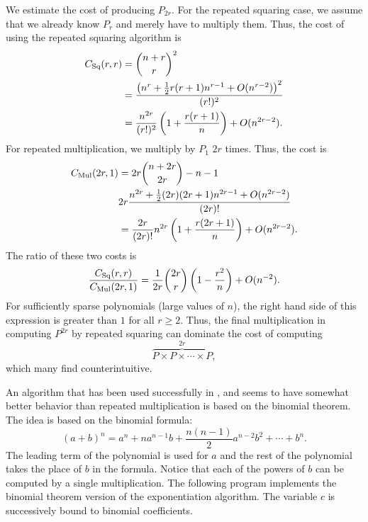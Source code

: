 We estimate the cost of producing $P_{2r}$.  For the repeated squaring
case, we assume that we already know $P_{r}$ and merely have to
multiply them.  Thus, the cost of using the repeated squaring
algorithm is
\[
\begin{aligned}
 C_{\rm Sq}(r,r) &= \binom{n + r}{r}^{2} \\
     & = \frac{\left(n^{r} + \frac{1}{2}r (r+1) n^{r-1}
                 + O(n^{r-2})\right)^{2}}{(r!)^{2}} \\
     & = \frac{n^{2r}}{(r!)^{2}}\left(1 + \frac{r(r+1)}{n}\right) 
                + O(n^{2r-2}).
\end{aligned}
\]
For repeated multiplication, we multiply by $P_{1}$ $2r$ times.  Thus, the
cost is
\[
\begin{aligned}
  C_{\rm Mul}(2r, 1) & = 2r \binom{n + 2r}{2r} - n-1 \\
     & 2r \frac{n^{2r} + \frac{1}{2}(2r)(2r+1) n^{2r-1} 
        + O(n^{2r-2})}{(2r)!} \\
     & = \frac{2r}{(2r)!}n^{2r}\left(1 + \frac{r(2r+1)}{n}\right) 
        + O(n^{2r-2}).
\end{aligned}
\]
The ratio of these two costs is 
\[
\frac{C_{\rm Sq}(r,r)}{C_{\rm Mul}(2r,1)} =
\frac{1}{2r} \binom{2r}{r} \left(1 - \frac{r^{2}}{n}\right) 
  + O(n^{-2}).
\]
For sufficiently sparse polynomials (large values of $n$), the right
hand side of this expression is greater than $1$ for all $r \ge 2$.
Thus, the final multiplication in computing $P^{2r}$ by repeated
squaring can dominate the cost of computing
\[
\overbrace{P \times P \times \cdots \times P}^{2r},
\]
which many find counterintuitive.

\medskip
An algorithm that has been used successfully in \Macsyma, and seems to have
somewhat better behavior than repeated multiplication is based on the
binomial theorem.  The idea is based on the binomial formula:
\[
(a + b)^n = a^n + n a^{n-1} b + \frac{n (n - 1)}{2} a^{n-2} b^2 +
\cdots + b^n.
\]
The leading term of the polynomial is used for $a$ and the rest of the
polynomial takes the place of $b$ in the formula.  Notice that each of the
powers of $b$ can be computed by a single multiplication.  The following
program implements the binomial theorem version of the exponentiation
algorithm.  The variable $c$ is successively bound to binomial
coefficients. 

